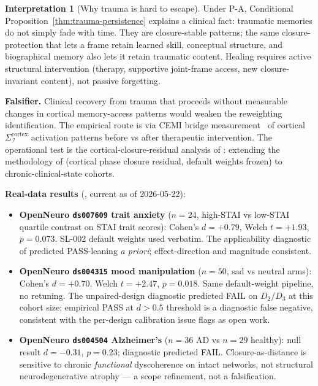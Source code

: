 \documentclass[11pt]{article}
\theoremstyle{plain}
\theoremstyle{definition}
\newtheorem{interpretation}[theorem]{Interpretation}
\theoremstyle{remark}
\newcommand{\Ical}{\mathcal{I}}
\begin{document}
\begin{interpretation}[Why trauma is hard to escape]\label{int:trauma}
Under P-A, Conditional Proposition~\ref{thm:trauma-persistence} explains a clinical fact: traumatic memories do not simply fade with time. They are closure-stable patterns; the same closure-protection that lets a frame retain learned skill, conceptual structure, and biographical memory also lets it retain traumatic content. Healing requires active structural intervention (therapy, supportive joint-frame access, new closure-invariant content), not passive forgetting.
\end{interpretation}

\textbf{Falsifier.} Clinical recovery from trauma that proceeds without measurable changes in cortical memory-access patterns would weaken the reweighting identification. The empirical route is via CEMI bridge measurement~\citep{SmartProcessingToPOV} of cortical $\Sigma_\Ical^{\mathrm{cortex}}$ activation patterns before vs after therapeutic intervention. The operational test is the cortical-closure-residual analysis of \citet{SolutionLab005}: extending the methodology of \citet{SolutionLab002} (cortical phase closure residual, default weights frozen) to chronic-clinical-state cohorts.

\textbf{Real-data results} (\citet{SolutionLab005}, current as of 2026-05-22):
\begin{itemize}[leftmargin=2em]
\item \textbf{OpenNeuro \texttt{ds007609} trait anxiety} ($n = 24$, high-STAI vs low-STAI quartile contrast on STAI trait scores): Cohen's $d = +0.79$, Welch $t = +1.93$, $p = 0.073$. SL-002 default weights used verbatim. The applicability diagnostic of \citet{SmartClosureDistance} predicted PASS-leaning \emph{a priori}; effect-direction and magnitude consistent.
\item \textbf{OpenNeuro \texttt{ds004315} mood manipulation} ($n = 50$, sad vs neutral arms): Cohen's $d = +0.70$, Welch $t = +2.47$, $p = 0.018$. Same default-weight pipeline, no retuning. The unpaired-design diagnostic predicted FAIL on $D_2/D_3$ at this cohort size; empirical PASS at $d > 0.5$ threshold is a diagnostic false negative, consistent with the per-design calibration issue \citet{SmartClosureDistance} flags as open work.
\item \textbf{OpenNeuro \texttt{ds004504} Alzheimer's} ($n = 36$ AD vs $n = 29$ healthy): null result $d = -0.31$, $p = 0.23$; diagnostic predicted FAIL. Closure-as-distance is sensitive to chronic \emph{functional} dyscoherence on intact networks, not structural neurodegenerative atrophy --- a scope refinement, not a falsification.
\end{itemize}
\end{document}
